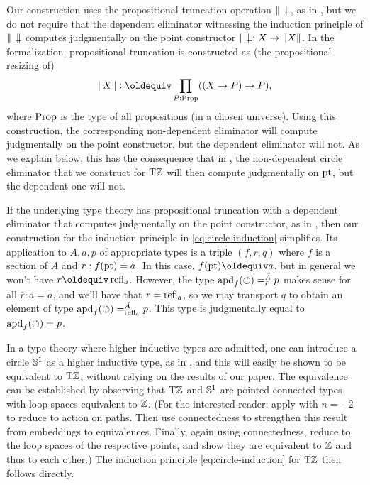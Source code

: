 \documentclass[a4paper,12pt]{amsart}
\begin{document}
Our construction uses the propositional truncation operation $\Trunc{\blank}$,
as in \cite[6.9]{hottbook},
but we do not require that the dependent eliminator
witnessing the induction principle of $\Trunc{\blank}$
computes judgmentally on the point constructor $\trunc{\blank}: X \to \Trunc X$.
In the \UniMath{} formalization, propositional truncation is constructed as
(the propositional resizing of)
\begin{equation}\label{eq:trunc-impred}
  \Trunc X \defeq \prod_{P:\Prop}((X \to P) \to P),
\end{equation}
where $\mathord{\mathrm{Prop}}$ is the type of all propositions (in a chosen universe).
Using this construction, the corresponding non-dependent eliminator
will compute judgmentally on the point constructor,
but the dependent eliminator will not.
As we explain below, this has the consequence that
in \UniMath{}, the non-dependent circle eliminator that we construct for ${\mathrm{T}\mathbb{Z}}$
will then compute judgmentally on ${\mathord{\mathrm{pt}}}$,
but the dependent one will not.

If the underlying type theory has propositional truncation with a dependent eliminator
that computes judgmentally on the point constructor, as in \cite[6.9]{hottbook},
then our construction for the induction principle in \cref{eq:circle-induction} simplifies.
Its application to $A,a,p$ of appropriate types
is a triple $(f,r,q)$ where $f$ is a section of $A$ and $r : f({\mathord{\mathrm{pt}}})= a$.
In this case, $f(\pt)\jdeq a$, but in general we won't have $r \jdeq \refl{a}$.
However, the type $\mathop{{\mathrm{apd}}_{f}}({\circlearrowleft}) =^{\tilde A}_{\bar r} p$ makes sense
for all $\bar r : a=a$, and we'll have that $r = \mathop{{\mathrm{refl}}_{a}}$,
so we may transport $q$ to obtain an element of type
$\mathop{{\mathrm{apd}}_{f}}({\circlearrowleft}) =^{\tilde A}_{\mathop{{\mathrm{refl}}_{a}}} p$.
This type is judgmentally equal to $\mathop{{\mathrm{apd}}_{f}}({\circlearrowleft})=p$.

In a type theory where higher inductive types are admitted,
one can introduce a circle ${\mathbb{S}^1}$ as a higher inductive type,
as in \cite[6.1]{hottbook},
and this will easily be shown to be equivalent to ${\mathrm{T}\mathbb{Z}}$,
without relying on the results of our paper.
The equivalence can be established by observing that ${\mathrm{T}\mathbb{Z}}$ and ${\mathbb{S}^1}$
are pointed connected types with loop spaces equivalent to $\mathbb{Z}$.
(For the interested reader: apply \cite[Lemma 7.6.2]{hottbook} with $n=-2$
to reduce to action on paths. Then use connectedness to strengthen
this result from embeddings to equivalences.
Finally, again using connectedness, reduce to the loop spaces
of the respective points, and show they are equivalent to $\mathbb{Z}$ and thus to each other.)
The induction principle \cref{eq:circle-induction} for ${\mathrm{T}\mathbb{Z}}$ then follows directly.
\end{document}
